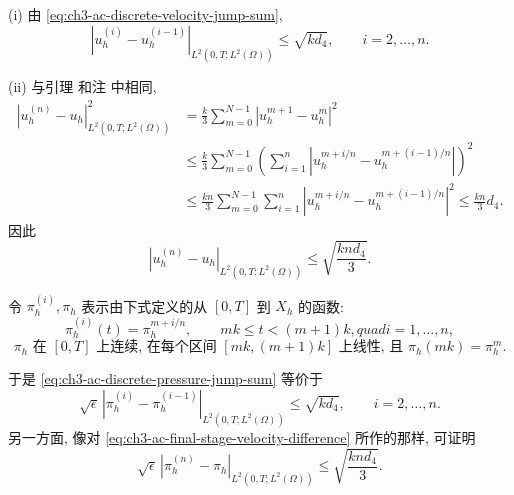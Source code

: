 \begin{Remark}
\label{rem:ch3-ac-velocity-stage-differences}
(i) 由 \eqref{eq:ch3-ac-discrete-velocity-jump-sum},
\begin{equation}
|u_h^{(i)}-u_h^{(i-1)}|_{L^2(0,T;L^2(\Omega))}
\leq\sqrt{kd_4},
\qquad i=2,\ldots,n.
\label{eq:ch3-ac-stage-velocity-difference}
\end{equation}

(ii) 与引理  和注  中相同,
\[
\begin{aligned}
|u_h^{(n)}-u_h|_{L^2(0,T;L^2(\Omega))}^2
&=\frac k3\sum_{m=0}^{N-1}|u_h^{m+1}-u_h^m|^2\\
&\leq\frac k3\sum_{m=0}^{N-1}
\left(\sum_{i=1}^n
|u_h^{m+i/n}-u_h^{m+(i-1)/n}|\right)^2\\
&\leq\frac{kn}{3}\sum_{m=0}^{N-1}\sum_{i=1}^n
|u_h^{m+i/n}-u_h^{m+(i-1)/n}|^2
\leq\frac{kn}{3}d_4.
\end{aligned}
\]
因此
\begin{equation}
|u_h^{(n)}-u_h|_{L^2(0,T;L^2(\Omega))}
\leq\sqrt{\frac{kn d_4}{3}}.
\label{eq:ch3-ac-final-stage-velocity-difference}
\end{equation}
\end{Remark}

\begin{Remark}
\label{rem:ch3-ac-pressure-interpolants}
令 $\pi_h^{(i)},\pi_h$ 表示由下式定义的从 $[0,T]$ 到 $X_h$ 的函数:
\begin{equation}
\pi_h^{(i)}(t)=\pi_h^{m+i/n},
\qquad mk\leq t<(m+1)k,quad i=1,\ldots,n,
\label{eq:ch3-ac-pressure-piecewise-constant}
\end{equation}
\begin{equation}
\pi_h\text{ 在 }[0,T]\text{ 上连续, 在每个区间 }[mk,(m+1)k]
\text{ 上线性, 且 }\pi_h(mk)=\pi_h^m.
\label{eq:ch3-ac-pressure-piecewise-linear}
\end{equation}

\hypertarget{chapter-03-page-319}{}
于是 \eqref{eq:ch3-ac-discrete-pressure-jump-sum} 等价于
\begin{equation}
\sqrt\epsilon\,
|\pi_h^{(i)}-\pi_h^{(i-1)}|_{L^2(0,T;L^2(\Omega))}
\leq\sqrt{kd_4},
\qquad i=2,\ldots,n.
\label{eq:ch3-ac-stage-pressure-difference}
\end{equation}
另一方面, 像对 \eqref{eq:ch3-ac-final-stage-velocity-difference} 所作的那样, 可证明
\begin{equation}
\sqrt\epsilon\,
|\pi_h^{(n)}-\pi_h|_{L^2(0,T;L^2(\Omega))}
\leq\sqrt{\frac{kn d_4}{3}}.
\label{eq:ch3-ac-final-stage-pressure-difference}
\end{equation}
\end{Remark}

